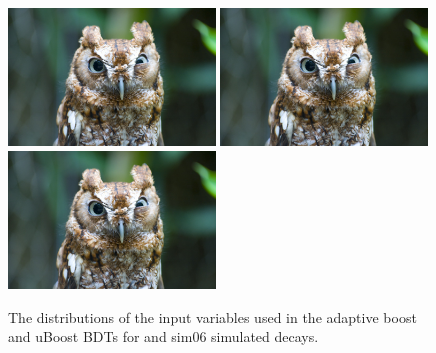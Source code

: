 \begin{figure}[htbp]
    \includegraphics[width=0.49\textwidth]{./Figs/placeholder.jpeg}
    \includegraphics[width=0.49\textwidth]{./Figs/placeholder.jpeg}
    \includegraphics[width=0.49\textwidth]{./Figs/placeholder.jpeg}
  \caption{The distributions of the input variables used in the adaptive boost and uBoost BDTs for \bsmumu and  sim06 simulated decays.}
  \label{fig:myBDTvars}
\end{figure}



